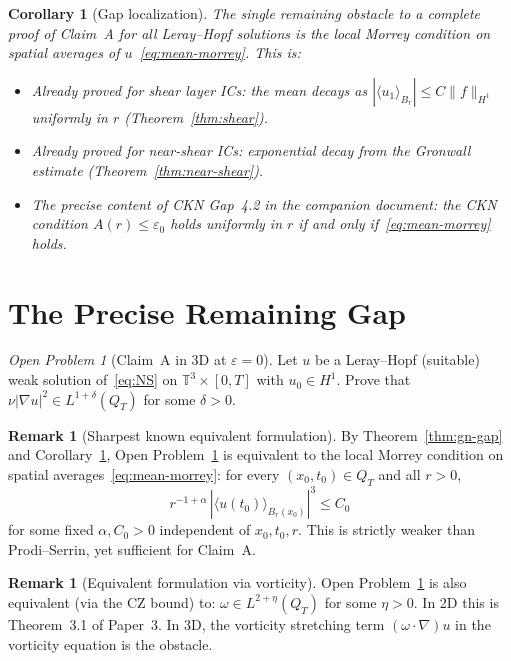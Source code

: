\documentclass[11pt]{article}
\newtheorem{corollary}[theorem]{Corollary}
\theoremstyle{definition}
\newtheorem{remark}[theorem]{Remark}
\theoremstyle{remark}
\newtheorem{openproblem}[theorem]{Open Problem}
\newcommand{\T}{\mathbb{T}}
\newcommand{\Hs}[1]{H^{#1}}
\newcommand{\grad}{\nabla}
\newcommand{\dlt}{\delta}
\newcommand{\eps}{\varepsilon}
\begin{document}
\begin{corollary}[Gap localization]
\label{cor:gap-local}
  The single remaining obstacle to a complete proof of Claim~A for all
  Leray--Hopf solutions is the \emph{local Morrey condition on spatial averages
  of $u$}~\eqref{eq:mean-morrey}.  This is:
  \begin{itemize}
    \item Already proved for shear layer ICs: the mean decays as
      $|\langle u_1\rangle_{B_r}|\leq C\|f\|_{H^1}$ uniformly in $r$
      (Theorem~\ref{thm:shear}).
    \item Already proved for near-shear ICs: exponential decay from the
      Gronwall estimate (Theorem~\ref{thm:near-shear}).
    \item The precise content of CKN Gap~4.2 in the companion document:
      the CKN condition $A(r)\leq\varepsilon_0$ holds uniformly in $r$
      if and only if~\eqref{eq:mean-morrey} holds.
  \end{itemize}
\end{corollary}

\section{The Precise Remaining Gap}
\label{sec:gap}

\begin{openproblem}[Claim~A in 3D at $\eps=0$]\label{op:main}
  Let $u$ be a Leray--Hopf (suitable) weak solution of~\eqref{eq:NS} on
  $\T^3\times[0,T]$ with $u_0\in\Hs{1}$.  Prove that
  $\nu|\grad u|^2\in L^{1+\dlt}(Q_T)$ for some $\dlt>0$.
\end{openproblem}

\begin{remark}[Sharpest known equivalent formulation]
  By Theorem~\ref{thm:gn-gap} and Corollary~\ref{cor:gap-local}, Open
  Problem~\ref{op:main} is equivalent to the local Morrey condition
  on spatial averages~\eqref{eq:mean-morrey}: for every
  $(x_0,t_0)\in Q_T$ and all $r>0$,
  \[
    r^{-1+\alpha}\,|\langle u(t_0)\rangle_{B_r(x_0)}|^3 \leq C_0
  \]
  for some fixed $\alpha,C_0>0$ independent of $x_0,t_0,r$.
  This is strictly weaker than Prodi--Serrin, yet sufficient for Claim~A.
\end{remark}

\begin{remark}[Equivalent formulation via vorticity]
  Open Problem~\ref{op:main} is also equivalent (via the CZ bound) to:
  $\omega\in L^{2+\eta}(Q_T)$ for some $\eta>0$.
  In 2D this is Theorem~3.1 of Paper~3.  In 3D, the vorticity stretching
  term $(\omega\cdot\grad)u$ in the vorticity equation is the obstacle.
\end{remark}
\end{document}
